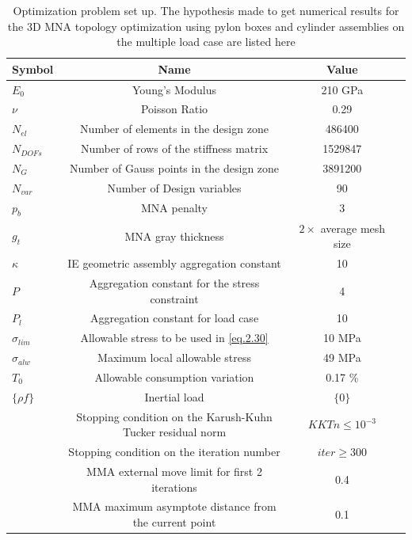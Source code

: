    
       \begin{table}[h]
                  \caption{\label{tab:table3.6} Optimization problem set up. The hypothesis made to get numerical results for the 3D MNA topology optimization using pylon boxes and cylinder assemblies on the multiple load case are listed here}
                   \centering
                   \begin{tabular}{lccc}
                   \hline
                    Symbol& Name& Value\\\hline
                   $E_0$ & Young's Modulus & 210 GPa\\
                   $\nu$ & Poisson Ratio& 0.29&\\ $N_{el}$ & Number of elements in the design zone & 486400 \\
                   $N_{DOFs}$ & Number of rows of the stiffness matrix & 1529847\\
                   $N_G$ & Number of Gauss points in the design zone & 3891200\\
                   $N_{var}$ & Number of Design variables & 90\\
          		$p_b$ & MNA penalty & 3\\
          		$g_t$ & MNA gray thickness & $2 \times$ average mesh size\\
          		$\kappa$ & IE geometric assembly aggregation constant & 10\\
          		$P$ & Aggregation constant for the stress constraint & 4\\  
          		$P_l$ & Aggregation constant for load case& 10\\ 
          		$\sigma_{lim}$ & Allowable stress to be used in \eqref{eq.2.30} & 10 MPa\\
          		$\sigma_{alw}$ & Maximum local allowable stress & 49 MPa\\
          		$T_0$ & Allowable consumption variation & 0.17 \% \\
          		$\lbrace\rho f \rbrace$ & Inertial load & $\lbrace 0 \rbrace$ \\
          		 & Stopping condition on the Karush-Kuhn Tucker residual norm & $KKTn\leq10^{-3}$\\ 
          		& Stopping condition on the iteration number & $iter \geq 300$ \\
          		& MMA external move limit for first 2 iterations & 0.4 \\
          		& MMA maximum asymptote distance from the current point & 0.1 \\
                   \hline
                   \end{tabular}
                   \end{table}
